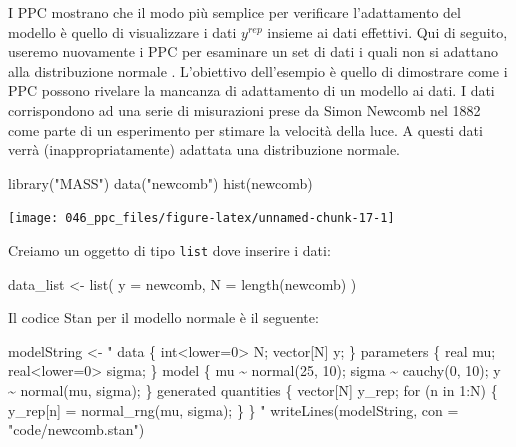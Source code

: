 \documentclass[
  10pt,
  italian,
  a4paper,
  extrafontsizes,onecolumn,openright
  ]{memoir}
\newenvironment{Shaded}{\begin{snugshade}}{\end{snugshade}}
\newcommand{\AttributeTok}[1]{\textcolor[rgb]{0.77,0.63,0.00}{#1}}
\newcommand{\FunctionTok}[1]{\textcolor[rgb]{0.00,0.00,0.00}{#1}}
\newcommand{\NormalTok}[1]{#1}
\newcommand{\OtherTok}[1]{\textcolor[rgb]{0.56,0.35,0.01}{#1}}
\newcommand{\StringTok}[1]{\textcolor[rgb]{0.31,0.60,0.02}{#1}}
\begin{document}
I PPC mostrano che il modo più semplice per verificare l'adattamento del modello è quello di visualizzare i dati \(y^{rep}\) insieme ai dati effettivi. Qui di seguito, useremo nuovamente i PPC per esaminare un set di dati i quali non si adattano alla distribuzione normale \autocite{gelman2020regression}. L'obiettivo dell'esempio è quello di dimostrare come i PPC possono rivelare la mancanza di adattamento di un modello ai dati. I dati corrispondono ad una serie di misurazioni prese da Simon Newcomb nel 1882 come parte di un esperimento per stimare la velocità della luce. A questi dati verrà (inappropriatamente) adattata una distribuzione normale.

\begin{Shaded}
\begin{Highlighting}[]
\FunctionTok{library}\NormalTok{(}\StringTok{"MASS"}\NormalTok{)}
\FunctionTok{data}\NormalTok{(}\StringTok{"newcomb"}\NormalTok{)}
\FunctionTok{hist}\NormalTok{(newcomb)}
\end{Highlighting}
\end{Shaded}

\begin{center}\texttt{[image: 046\_ppc\_files/figure-latex/unnamed-chunk-17-1]} \end{center}

\noindent
Creiamo un oggetto di tipo \texttt{list} dove inserire i dati:

\begin{Shaded}
\begin{Highlighting}[]
\NormalTok{data\_list }\OtherTok{\textless{}{-}} \FunctionTok{list}\NormalTok{(}
  \AttributeTok{y =}\NormalTok{ newcomb,}
  \AttributeTok{N =} \FunctionTok{length}\NormalTok{(newcomb)}
\NormalTok{)}
\end{Highlighting}
\end{Shaded}

\noindent
Il codice Stan per il modello normale è il seguente:

\begin{Shaded}
\begin{Highlighting}[]
\NormalTok{modelString }\OtherTok{\textless{}{-}} \StringTok{"}
\StringTok{data \{}
\StringTok{  int\textless{}lower=0\textgreater{} N;}
\StringTok{  vector[N] y;}
\StringTok{\}}
\StringTok{parameters \{}
\StringTok{  real mu;}
\StringTok{  real\textless{}lower=0\textgreater{} sigma;}
\StringTok{\}}
\StringTok{model \{}
\StringTok{  mu \textasciitilde{} normal(25, 10);}
\StringTok{  sigma \textasciitilde{} cauchy(0, 10);}
\StringTok{  y \textasciitilde{} normal(mu, sigma);}
\StringTok{\}}
\StringTok{generated quantities \{}
\StringTok{  vector[N] y\_rep;}
\StringTok{  for (n in 1:N) \{}
\StringTok{    y\_rep[n] = normal\_rng(mu, sigma);}
\StringTok{  \}}
\StringTok{\}}
\StringTok{"}
\FunctionTok{writeLines}\NormalTok{(modelString, }\AttributeTok{con =} \StringTok{"code/newcomb.stan"}\NormalTok{)}
\end{Highlighting}
\end{Shaded}
\end{document}
